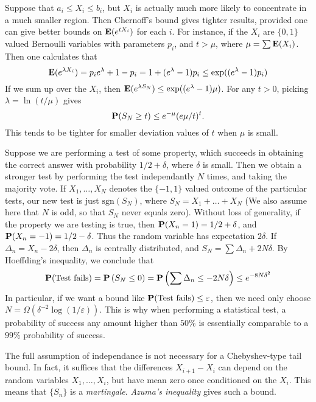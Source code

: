 Suppose that $a_i \leq X_i \leq b_i$, but $X_i$ is actually much more likely to concentrate in a much smaller region. Then Chernoff's bound gives tighter results, provided one can give better bounds on $\operatorname{\mathbf{E}}(e^{t X_i})$ for each $i$. For instance, if the $X_i$ are $\{ 0, 1 \}$ valued Bernoulli variables with parameters $p_i$, and $t > \mu$, where $\mu = \sum \operatorname{\mathbf{E}}(X_i)$. Then one calculates that
%
\[ \operatorname{\mathbf{E}}(e^{\lambda X_i}) = p_i e^\lambda + 1 - p_i = 1 + (e^\lambda - 1) p_i \leq \exp( (e^\lambda - 1) p_i ) \]
%
If we sum up over the $X_i$, then $\operatorname{\mathbf{E}}(e^{\lambda S_N}) \leq \exp( (e^\lambda - 1) \mu )$. For any $t > 0$, picking $\lambda = \ln(t/\mu)$ gives
%
\[ \mathbf{P}(S_N \geq t) \leq e^{-\mu} (e \mu/t)^t.  \]
%
This tends to be tighter for smaller deviation values of $t$ when $\mu$ is small.

\begin{example}
    Suppose we are performing a test of some property, which succeeds in obtaining the correct answer with probability $1/2 + \delta$, where $\delta$ is small. Then we obtain a stronger test by performing the test independantly $N$ times, and taking the majority vote. If $X_1,\dots, X_N$ denotes the $\{ -1,1 \}$ valued outcome of the particular tests, our new test is just $\text{sgn}(S_N)$, where $S_N = X_1 + \dots + X_N$ (We also assume here that $N$ is odd, so that $S_N$ never equals zero). Without loss of generality, if the property we are testing is true, then $\operatorname{\mathbf{P}}(X_n = 1) = 1/2 + \delta$, and $\operatorname{\mathbf{P}}(X_n = -1) = 1/2 - \delta$. Thus the random variable has expectation $2\delta$. If $\Delta_n = X_n - 2\delta$, then $\Delta_n$ is centrally distributed, and $S_N = \sum \Delta_n + 2N \delta$. By Hoeffding's inequality, we conclude that
    \[ \operatorname{\mathbf{P}}(\text{Test fails}) = \operatorname{\mathbf{P}} \left( S_N \leq 0 \right) = \operatorname{\mathbf{P}} \left( \sum \Delta_n \leq -2N\delta \right) \leq e^{-8N \delta^2} \]
    In particular, if we want a bound like $\operatorname{\mathbf{P}}(\text{Test fails}) \leq \varepsilon$, then we need only choose $N = \Omega(\delta^{-2} \log(1/\varepsilon))$. This is why when performing a statistical test, a probability of success any amount higher than $50 \%$ is essentially comparable to a $99\%$ probability of success.
\end{example}

The full assumption of independance is not necessary for a Chebyshev-type tail bound. In fact, it suffices that the differences $X_{i+1} - X_i$ can depend on the random variables $X_1, \dots, X_i$, but have mean zero once conditioned on the $X_i$. This means that $\{ S_n \}$ is a \emph{martingale}. \emph{Azuma's inequality} gives such a bound.

